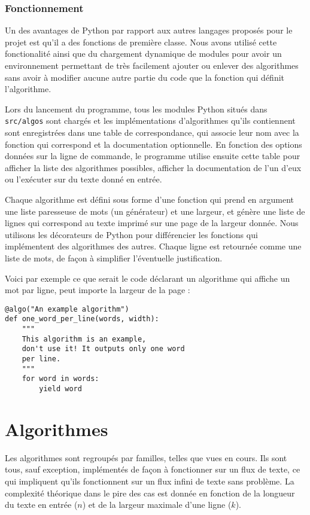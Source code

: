 \documentclass[a4paper, 11pt]{article}
\begin{document}
\section{Fonctionnement}

Un des avantages de Python par rapport aux autres langages proposés pour le
projet est qu'il a des fonctions de première classe. Nous avons utilisé cette
fonctionalité ainsi que du chargement dynamique de modules pour avoir un
environnement permettant de très facilement ajouter ou enlever des algorithmes
sans avoir à modifier aucune autre partie du code que la fonction qui définit
l'algorithme.

Lors du lancement du programme, tous les modules Python situés dans
\verb|src/algos| sont chargés et les implémentations d'algorithmes qu'ils
contiennent sont enregistrées dans une table de correspondance, qui associe leur
nom avec la fonction qui correspond et la documentation optionnelle. En fonction
des options données sur la ligne de commande, le programme utilise ensuite cette
table pour afficher la liste des algorithmes possibles, afficher la
documentation de l'un d'eux ou l'exécuter sur du texte donné en entrée.

Chaque algorithme est défini sous forme d'une fonction qui prend en argument une
liste paresseuse de mots (un générateur) et une largeur, et génère une liste
de lignes qui correspond au texte imprimé sur une page de la largeur donnée.
Nous utilisons les décorateurs de Python pour différencier les fonctions qui
implémentent des algorithmes des autres. Chaque ligne est retournée comme une
liste de mots, de façon à simplifier l'éventuelle justification.

Voici par exemple ce que serait le code déclarant un algorithme qui affiche un
mot par ligne, peut importe la largeur de la page :

\begin{verbatim}
@algo("An example algorithm")
def one_word_per_line(words, width):
    """
    This algorithm is an example,
    don't use it! It outputs only one word
    per line.
    """
    for word in words:
        yield word
\end{verbatim}

\part{Algorithmes}

Les algorithmes sont regroupés par familles, telles que vues en cours. Ils sont
tous, sauf exception, implémentés de façon à fonctionner sur un flux de texte,
ce qui impliquent qu'ils fonctionnent sur un flux infini de texte sans problème.
La complexité théorique dans le pire des cas est donnée en fonction de la
longueur du texte en entrée ($n$) et de la largeur maximale d'une ligne ($k$).
\end{document}
